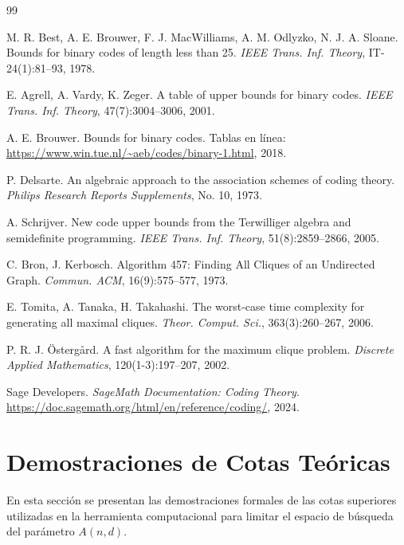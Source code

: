 \documentclass[12pt, spanish]{article}
\begin{document}
\begin{thebibliography}{99}

M. R. Best, A. E. Brouwer, F. J. MacWilliams, A. M. Odlyzko, N. J. A. Sloane.
\newblock Bounds for binary codes of length less than 25.
\newblock \textit{IEEE Trans. Inf. Theory}, IT-24(1):81–93, 1978.

E. Agrell, A. Vardy, K. Zeger.
\newblock A table of upper bounds for binary codes.
\newblock \textit{IEEE Trans. Inf. Theory}, 47(7):3004–3006, 2001.

A. E. Brouwer.
\newblock Bounds for binary codes.
\newblock Tablas en línea: \url{https://www.win.tue.nl/~aeb/codes/binary-1.html}, 2018.

P. Delsarte.
\newblock An algebraic approach to the association schemes of coding theory.
\newblock \textit{Philips Research Reports Supplements}, No. 10, 1973.

A. Schrijver.
\newblock New code upper bounds from the Terwilliger algebra and semidefinite programming.
\newblock \textit{IEEE Trans. Inf. Theory}, 51(8):2859–2866, 2005.

C. Bron, J. Kerbosch.
\newblock Algorithm 457: Finding All Cliques of an Undirected Graph.
\newblock \textit{Commun. ACM}, 16(9):575–577, 1973.

E. Tomita, A. Tanaka, H. Takahashi.
\newblock The worst-case time complexity for generating all maximal cliques.
\newblock \textit{Theor. Comput. Sci.}, 363(3):260–267, 2006.

P. R. J. Östergård.
\newblock A fast algorithm for the maximum clique problem.
\newblock \textit{Discrete Applied Mathematics}, 120(1-3):197–207, 2002.

Sage Developers.
\newblock \textit{SageMath Documentation: Coding Theory}.
\newblock \url{https://doc.sagemath.org/html/en/reference/coding/}, 2024.

\end{thebibliography}

\appendix
\section{Demostraciones de Cotas Teóricas}
\label{apendice:demostraciones}

En esta sección se presentan las demostraciones formales de las cotas superiores utilizadas en la herramienta computacional para limitar el espacio de búsqueda del parámetro $A(n,d)$.


\end{document}
